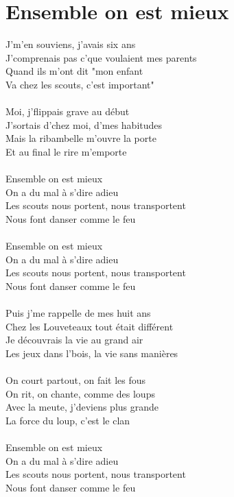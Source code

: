 \section*{Ensemble on est mieux}
J'm'en souviens, j'avais six ans\\
J'comprenais pas c'que voulaient mes parents\\
Quand ils m'ont dit "mon enfant\\
Va chez les scouts, c'est important"\\\\
Moi, j'flippais grave au début\\
J'sortais d'chez moi, d'mes habitudes\\
Mais la ribambelle m'ouvre la porte\\
Et au final le rire m'emporte\\\\
Ensemble on est mieux\\
On a du mal à s'dire adieu\\
Les scouts nous portent, nous transportent\\
Nous font danser comme le feu\\\\
Ensemble on est mieux\\
On a du mal à s'dire adieu\\
Les scouts nous portent, nous transportent\\
Nous font danser comme le feu\\\\
Puis j'me rappelle de mes huit ans\\
Chez les Louveteaux tout était différent\\
Je découvrais la vie au grand air\\
Les jeux dans l'bois, la vie sans manières\\\\
On court partout, on fait les fous\\
On rit, on chante, comme des loups\\
Avec la meute, j'deviens plus grande\\
La force du loup, c'est le clan\\\\
Ensemble on est mieux\\
On a du mal à s'dire adieu\\
Les scouts nous portent, nous transportent\\
Nous font danser comme le feu\\\\
